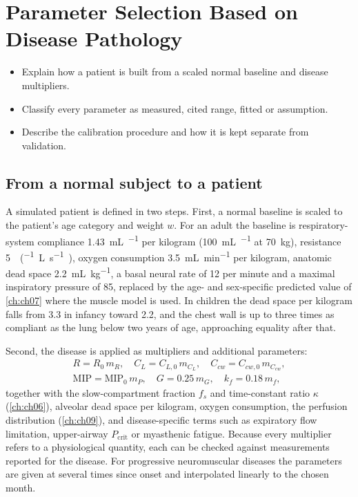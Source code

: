 \chapter{Parameter Selection Based on Disease Pathology}
\label{ch:ch12}

\begin{objectives}
\begin{itemize}[leftmargin=*]
  \item Explain how a patient is built from a scaled normal baseline and disease multipliers.
  \item Classify every parameter as measured, cited range, fitted or assumption.
  \item Describe the calibration procedure and how it is kept separate from validation.
\end{itemize}
\end{objectives}

\section{From a normal subject to a patient}
\label{sec:par-base}
A simulated patient is defined in two steps. First, a normal baseline is scaled to the patient's age category and weight $w$. For an adult the baseline is respiratory-system compliance \SI{1.43}{\milli\liter\per\cmH} per kilogram (\SI{100}{\milli\liter\per\cmH} at \SI{70}{\kilo\gram}), resistance \SI{5}{\cmH\per(\liter\per\second)}, oxygen consumption \SI{3.5}{\milli\liter\per\minute} per kilogram, anatomic dead space \SI{2.2}{\milli\liter\per\kilogram}, a basal neural rate of 12 per minute and a maximal inspiratory pressure of \SI{85}{\cmH}, replaced by the age- and sex-specific predicted value of \cref{ch:ch07} where the muscle model is used. In children the dead space per kilogram falls from 3.3 in infancy toward 2.2, and the chest wall is up to three times as compliant as the lung below two years of age, approaching equality after that.

Second, the disease is applied as multipliers and additional parameters:
\begin{equation}
\begin{gathered}
R = R_0\,m_R,\quad C_L = C_{L,0}\,m_{C_L},\quad C_{cw} = C_{cw,0}\,m_{C_{cw}},\\
\mathrm{MIP} = \mathrm{MIP_0}\,m_P,\quad G = 0.25\,m_G,\quad k_f = 0.18\,m_f,
\end{gathered}
\label{eq:par-mult}
\end{equation}
together with the slow-compartment fraction $f_s$ and time-constant ratio $\kappa$ (\cref{ch:ch06}), alveolar dead space per kilogram, oxygen consumption, the perfusion distribution (\cref{ch:ch09}), and disease-specific terms such as expiratory flow limitation, upper-airway $P_{\mathrm{crit}}$ or myasthenic fatigue. Because every multiplier refers to a physiological quantity, each can be checked against measurements reported for the disease. For progressive neuromuscular diseases the parameters are given at several times since onset and interpolated linearly to the chosen month.

